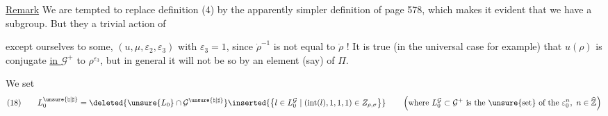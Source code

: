 \uline{Remark} We are tempted to replace definition (4)
by the apparently simpler definition of page 578,
which makes it evident that we have a subgroup.
But they 
a trivial action of



except   ourselves to some, $(u,\mu,\varepsilon_2,\varepsilon_3)$ with $\varepsilon_3=1$,
since $\dot{\rho}^{-1}$ is not equal to $\dot{\rho}$ ! It is true 
(in the universal case for example) that $u(\rho)$ is conjugate \uline{in $\mathcal{G}^{+}$}
to $\rho^{\varepsilon_3}$, but in general it will not be so by an element (say) of $\Pi$.

We set
\[
(18)\qquad
L_0^{\unsure{\natural|\sharp}}
=\deleted{\unsure{L_0}\cap\mathcal{G}^{\unsure{\natural|\sharp}}}
\inserted{\bigl\{l\in L_0^{\mathcal{G}}\mid
(\operatorname{int}(l),1,1,1)\in Z_{\rho,\sigma}\bigr\}}
\qquad
\left(\text{where }L_0^{\mathcal{G}}\subset\mathcal{G}^{+}
\text{ is the \unsure{set} of the }\varepsilon_0^n,\ n\in\widehat{\mathbb{Z}}\right)
\]

